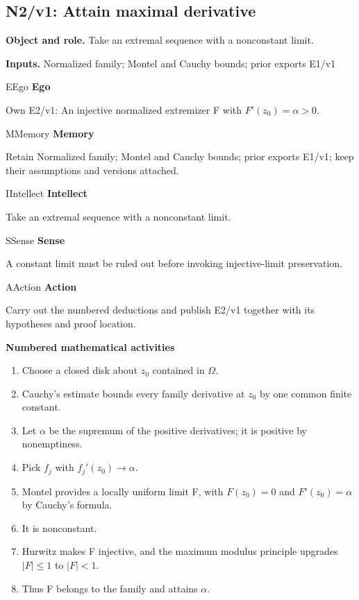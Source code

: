 \documentclass[preprint,12pt,aps,pra,showkeys,amsmath,amssymb,superscriptaddress,floatfix]{revtex4-2}
\theoremstyle{definition}
\theoremstyle{remark}
\newcommand{\mmfaculty}[3]{%
 \begin{mmfacultybox}{#1}{#2}
 {\sffamily\bfseries\color{MMBlue}#2}\par\smallskip #3
 \end{mmfacultybox}}
\newcommand{\field}[2]{\par\smallskip\noindent\textbf{#1.} #2\par}
\begin{document}
\clearpage

\subsection{N2/v1: Attain maximal derivative}

\field{Object and role}{Take an extremal sequence with a nonconstant limit.}

\field{Inputs}{Normalized family; Montel and Cauchy bounds; prior exports E1/v1}

\mmfaculty{E}{Ego}{Own E2/v1: An injective normalized extremizer F with
\(F'(z_{0})=\alpha >0\).}

\mmfaculty{M}{Memory}{Retain Normalized family; Montel and Cauchy bounds; prior exports E1/v1;
keep their assumptions and versions attached.}

\mmfaculty{I}{Intellect}{Take an extremal sequence with a nonconstant limit.}

\mmfaculty{S}{Sense}{A constant limit must be ruled out before invoking injective-limit
preservation.}

\mmfaculty{A}{Action}{Carry out the numbered deductions and publish E2/v1 together with its
hypotheses and proof location.}

\smallskip\noindent\textbf{Numbered mathematical activities}

\begin{enumerate}[label=N2.\arabic*,leftmargin=3.4em]

\item Choose a closed disk about \(z_{0}\) contained in \(\Omega\).

\item Cauchy's estimate bounds every family derivative at \(z_{0}\) by one
common finite constant.

\item Let \(\alpha\) be the supremum of the positive derivatives; it is
positive by nonemptiness.

\item Pick \(f_j\) with \(f_j'(z_{0})\to \alpha\).

\item Montel provides a locally uniform limit F, with \(F(z_{0})=0\) and
\(F'(z_{0})=\alpha\) by Cauchy's formula.

\item It is nonconstant.

\item Hurwitz makes F injective, and the maximum modulus principle upgrades
\(|F|\le 1\) to \(|F|<1\).

\item Thus F belongs to the family and attains \(\alpha\).

\end{enumerate}
\end{document}
